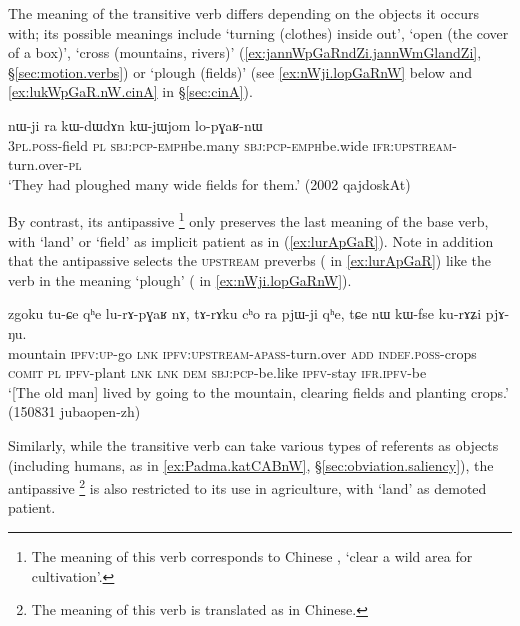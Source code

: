 The meaning of the transitive verb  differs depending on the  objects it occurs with; its possible meanings include `turning (clothes) inside out', `open (the cover of a box)', `cross (mountains, rivers)' (\ref{ex:jannWpGaRndZi.jannWmGlandZi}, §\ref{sec:motion.verbs}) or `plough (fields)' (see \ref{ex:nWji.lopGaRnW} below and \ref{ex:lukWpGaR.nW.cinA} in §\ref{sec:cinA}). 

\begin{exe}
\ex \label{ex:nWji.lopGaRnW}
\gll nɯ-ji ra kɯ-dɯ\redp{}dɤn kɯ-jɯ\redp{}jom lo-pɣaʁ-nɯ \\
\textsc{3pl}.\textsc{poss}-field \textsc{pl} \textsc{sbj}:\textsc{pcp}-\textsc{emph}\redp{}be.many \textsc{sbj}:\textsc{pcp}-\textsc{emph}\redp{}be.wide \textsc{ifr}:\textsc{upstream}-turn.over-\textsc{pl} \\
\glt `They had ploughed many wide fields for them.' (2002 qajdoskAt)
\end{exe}

By contrast, its antipassive \footnote{The meaning of this verb corresponds to Chinese , `clear a wild area for cultivation'.}  only preserves the last meaning of the base verb, with `land' or `field' as implicit patient as in (\ref{ex:lurApGaR}). Note in addition that the antipassive selects the \textsc{upstream} preverbs ( in \ref{ex:lurApGaR}) like the verb  in the meaning `plough' ( in \ref{ex:nWji.lopGaRnW}).

\begin{exe}
\ex \label{ex:lurApGaR}
\gll zgoku tu-ɕe qʰe lu-rɤ-pɣaʁ nɤ, tɤ-rɤku cʰo ra pjɯ-ji qʰe,  tɕe nɯ kɯ-fse ku-rɤʑi pjɤ-ŋu. \\
mountain \textsc{ipfv}:\textsc{up}-go \textsc{lnk} \textsc{ipfv}:\textsc{upstream}-\textsc{apass}-turn.over \textsc{add} \textsc{indef}.\textsc{poss}-crops \textsc{comit} \textsc{pl} \textsc{ipfv}-plant \textsc{lnk} \textsc{lnk} \textsc{dem} \textsc{sbj}:\textsc{pcp}-be.like \textsc{ipfv}-stay \textsc{ifr}.\textsc{ipfv}-be \\
\glt `[The old man] lived by going to the mountain, clearing fields and  planting crops.' (150831 jubaopen-zh)
\end{exe}

Similarly, while the transitive verb  can take various types of referents as objects (including humans, as in \ref{ex:Padma.katCABnW}, §\ref{sec:obviation.saliency}), the antipassive \footnote{The meaning of this verb is translated as  in Chinese. } is also restricted to its use in agriculture, with `land' as demoted patient.

